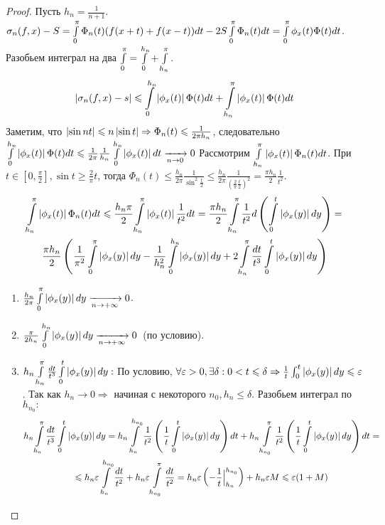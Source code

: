 \begin{proof}
	Пусть $h_n = \frac{1}{n + 1}$. $\sigma_n(f, x) - S 
	= \int\limits_{0}^{\pi} \Phi_n(t)(f(x + t) + f(x - t))dt - 2S \int\limits_{0}^{\pi} \Phi_n(t)dt
	= \int\limits_{0}^{\pi} \phi_x(t)\Phi(t)dt$.
	Разобьем интеграл на два $\int\limits_{0}^{\pi} = \int\limits_{0}^{h_n} + \int\limits_{h_n}^{\pi}$.
	\begin{gather*}
		\left|\sigma_n(f, x) - s\right| \leqslant \int\limits_{0}^{h_n} \left|\phi_x(t)\right| \Phi(t)dt +
		\int\limits_{h_n}^{\pi} \left|\phi_x(t)\right| \Phi(t)dt
	\end{gather*}
	Заметим, что $\left|\sin nt\right| \leqslant n \left|\sin t\right| \Rightarrow \Phi_n(t) \leqslant 
	\frac{1}{2\pi h_n}$, следовательно $\int\limits_{0}^{h_n} \left|\phi_x(t)\right| \Phi(t)dt \leqslant
	\frac{1}{2\pi} \frac{1}{h_n} \int\limits_{0}^{h_n} \left|\phi_x(t)\right|dt 
	\xrightarrow[n \rightarrow 0]{} 0$  
	Рассмотрим $\int\limits_{h_n}^{\pi}\left|\phi_x(t)\right|\Phi_n(t)dt$.
	При $t \in \left[ 0, \frac{\pi}{2}\right], \sin t \geqslant \frac{2}{\pi}t$, 
	тогда $\Phi_n(t) \leqslant \frac{h_n}{2\pi} \frac{1}{\sin^2\frac{t}{2}} \leqslant
	\frac{h_n}{2\pi}\frac{1}{\left(\frac{2}{\pi} \frac{t}{2} \right)^2} = \frac{\pi h_n}{2} \frac{1}{t^2}$.
	\begin{gather*}
		\int\limits_{h_n}^{\pi}\left|\phi_x(t)\right|\Phi_n(t)dt \leqslant 
		\frac{h_n\pi}{2}\int\limits_{h_n}^{\pi}\left|\phi_x(t)\right|\frac{1}{t^2}dt
		= \frac{\pi h_n}{2} \int\limits_{h_n}^{\pi} \frac{1}{t^2}d\left( \int\limits_{0}^{t} \left|\phi_x(y)\right| dy\right) = \\
		\frac{\pi h_n}{2}\left( \frac{1}{\pi^2}\int\limits_{0}^{\pi} \left|\phi_x(y)\right|dy - 
		\frac{1}{h_n^2}\int\limits_{0}^{h_n}\left|\phi_x(y)\right| dy + 2\int\limits_{h_n}^{\pi} 
		\frac{dt}{t^3}\int\limits_{0}^{t}\left|\phi_x(y)\right|dy\right) 
	\end{gather*}
	
	\newpage

	\begin{enumerate}
		\item $\frac{h_n}{2\pi}\int\limits_{0}^{\pi} \left|\phi_x(y)\right|dy \xrightarrow[n \rightarrow +\infty]{} 0$.
		\item $\frac{\pi}{2h_n}\int\limits_{0}^{h_n}\left|\phi_x(y)\right| dy \xrightarrow[n \rightarrow +\infty]{} 0\:$
			(по условию). 
		\item $h_n\int\limits_{h_n}^{\pi} \frac{dt}{t^3}\int\limits_{0}^{t}\left|\phi_x(y)\right|dy:$
			По условию, $\forall\varepsilon >0 , \exists \delta : 0 < t \leqslant 
			\delta \Rightarrow \frac{1}{t}\int_{0}^{t}\left|\phi_x(y)\right|dy \leqslant \varepsilon$.
			Так как $h_n \rightarrow 0 \Rightarrow$ начиная с некоторого $n_0, h_n \leqslant \delta$. 
			Разобьем интеграл по $h_{n_0}:$
			\begin{gather*}
				h_n\int\limits_{h_n}^{\pi} \frac{dt}{t^3}\int\limits_{0}^{t}\left|\phi_x(y)\right|dy = 
				h_n \int\limits_{h_n}^{h_{n_0}} \frac{1}{t^2}\left( 
				\frac{1}{t}\int\limits_{0}^{t}\left|\phi_x(y)\right|dy \right) dt
				+ h_n \int\limits_{h_{n_0}}^{\pi} \frac{1}{t^2} 
				\left( \frac{1}{t}\int\limits_{0}^{t}\left|\phi_x(y)\right|dy \right) dt = \\
				\leqslant h_n \varepsilon \int\limits_{h_n}^{h_{n_0}}\frac{dt}{t^2} + 
				h_n \varepsilon \int\limits_{h_{n_0}}^{\pi} \frac{dt}{t^2} =
				h_n \varepsilon \left( -\frac{1}{t}\Big|_{h_n}^{h_{n_0}}\right) + h_n \varepsilon M
				\leqslant \varepsilon (1 + M)
			\end{gather*}
	\end{enumerate}
\end{proof}

